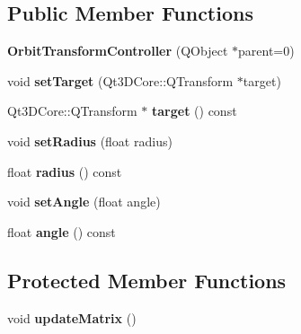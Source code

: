 \subsection*{Public Member Functions}
\begin{DoxyCompactItemize}
\item 
{\bfseries Orbit\+Transform\+Controller} (Q\+Object $\ast$parent=0)\hypertarget{class_orbit_transform_controller_a45fa9bde3a0a7a1d57d879966a4056ac}{}\label{class_orbit_transform_controller_a45fa9bde3a0a7a1d57d879966a4056ac}

\item 
void {\bfseries set\+Target} (Qt3\+D\+Core\+::\+Q\+Transform $\ast$target)\hypertarget{class_orbit_transform_controller_a1a5651760f79cec5e5cac9e8a46411f7}{}\label{class_orbit_transform_controller_a1a5651760f79cec5e5cac9e8a46411f7}

\item 
Qt3\+D\+Core\+::\+Q\+Transform $\ast$ {\bfseries target} () const \hypertarget{class_orbit_transform_controller_a3cea976555311c54b8ae0b6ee22cce8e}{}\label{class_orbit_transform_controller_a3cea976555311c54b8ae0b6ee22cce8e}

\item 
void {\bfseries set\+Radius} (float radius)\hypertarget{class_orbit_transform_controller_aa39976e56c899dabc71ead7ec83df41a}{}\label{class_orbit_transform_controller_aa39976e56c899dabc71ead7ec83df41a}

\item 
float {\bfseries radius} () const \hypertarget{class_orbit_transform_controller_ac64ff74f6c8b5bbbce267e475bd44725}{}\label{class_orbit_transform_controller_ac64ff74f6c8b5bbbce267e475bd44725}

\item 
void {\bfseries set\+Angle} (float angle)\hypertarget{class_orbit_transform_controller_a3d59107dc7f63b535f477d65a4183303}{}\label{class_orbit_transform_controller_a3d59107dc7f63b535f477d65a4183303}

\item 
float {\bfseries angle} () const \hypertarget{class_orbit_transform_controller_aacb85bd74a4120fce4de237d84763017}{}\label{class_orbit_transform_controller_aacb85bd74a4120fce4de237d84763017}

\end{DoxyCompactItemize}
\subsection*{Protected Member Functions}
\begin{DoxyCompactItemize}
\item 
void {\bfseries update\+Matrix} ()\hypertarget{class_orbit_transform_controller_ad225ee6e4c6545a804d542606585f6dd}{}\label{class_orbit_transform_controller_ad225ee6e4c6545a804d542606585f6dd}

\end{DoxyCompactItemize}
